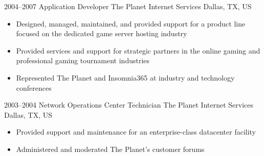 \documentclass[11pt,a4paper,sans]{moderncv}
\begin{document}
  \cventry
    {2004--2007}
    {Application Developer}
    {The Planet Internet Services}
    {Dallas, TX, US}
    {}
    {
      \begin{itemize}
        \item Designed, managed, maintained, and provided support for a product line focused on the dedicated game server hosting industry
        \item Provided services and support for strategic partners in the online gaming and professional gaming tournament industries
        \item Represented The Planet and Insomnia365 at industry and technology conferences
      \end{itemize}
    }

  \cventry
    {2003--2004}
    {Network Operations Center Technician}
    {The Planet Internet Services}
    {Dallas, TX, US}
    {}
    {
      \begin{itemize}
        \item Provided support and maintenance for an enterprise-class datacenter facility
        \item Administered and moderated The Planet's customer forums
      \end{itemize}
    }

\end{document}
